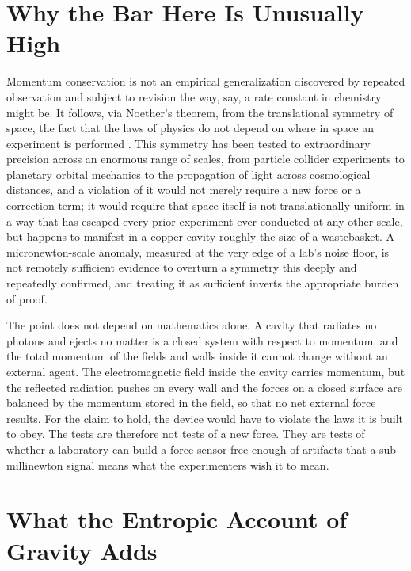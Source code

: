 \documentclass[11pt]{article}
\begin{document}
\section{Why the Bar Here Is Unusually High}

Momentum conservation is not an empirical generalization discovered by repeated observation and subject to revision the way, say, a rate constant in chemistry might be. It follows, via Noether's theorem, from the translational symmetry of space, the fact that the laws of physics do not depend on where in space an experiment is performed \cite{N1918}. This symmetry has been tested to extraordinary precision across an enormous range of scales, from particle collider experiments to planetary orbital mechanics to the propagation of light across cosmological distances, and a violation of it would not merely require a new force or a correction term; it would require that space itself is not translationally uniform in a way that has escaped every prior experiment ever conducted at any other scale, but happens to manifest in a copper cavity roughly the size of a wastebasket. A micronewton-scale anomaly, measured at the very edge of a lab's noise floor, is not remotely sufficient evidence to overturn a symmetry this deeply and repeatedly confirmed, and treating it as sufficient inverts the appropriate burden of proof.

The point does not depend on mathematics alone. A cavity that radiates no photons and ejects no matter is a closed system with respect to momentum, and the total momentum of the fields and walls inside it cannot change without an external agent. The electromagnetic field inside the cavity carries momentum, but the reflected radiation pushes on every wall and the forces on a closed surface are balanced by the momentum stored in the field, so that no net external force results. For the claim to hold, the device would have to violate the laws it is built to obey. The tests are therefore not tests of a new force. They are tests of whether a laboratory can build a force sensor free enough of artifacts that a sub-millinewton signal means what the experimenters wish it to mean.

\section{What the Entropic Account of Gravity Adds}
\end{document}
